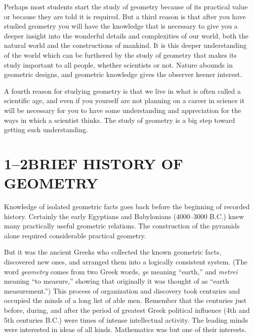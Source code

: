 \documentclass[11pt]{book}
\begin{document}
Perhaps most students start the study of geometry because of its practical value
or because they are told it is required. But a third reason is that after you
have studied geometry you will have the knowledge that is necessary to give you a
deeper insight into the wonderful details and complexities of our world, both the
natural world and the constructions of mankind. It is this deeper understanding
of the world which can be furthered by the study of geometry that makes its study
important to all people, whether scientists or not. Nature abounds in geometric
designs, and geometric knowledge gives the observer keener interest.

A fourth reason for studying geometry is that we live in what is often called a
scientific age, and even if you yourself are not planning on a career in science
it will be necessary for you to have some understanding and appreciation for the
ways in which a scientist thinks. The study of geometry is a big step toward
getting such understanding.

\section*{1--2\quad BRIEF HISTORY OF GEOMETRY}

\setcounter{footnote}{0}
Knowledge of isolated geometric facts goes back before the beginning of recorded
history. Certainly the early Egyptians and Babylonians (4000--3000 B.C.) knew
many practically useful geometric relations. The construction of the pyramids
alone required considerable practical geometry.

But it was the ancient Greeks who collected the known geometric facts, discovered
new ones, and arranged them into a logically consistent system. (The word
\emph{geometry} comes from two Greek words, \emph{ge} meaning ``earth,'' and
\emph{metrei} meaning ``to measure,'' showing that originally it was thought of
as ``earth measurement.'') This process of organization and discovery took
centuries and occupied the minds of a long list of able men. Remember that the
centuries just before, during, and after the period of greatest Greek political
influence (4th and 5th centuries B.C.) were times of intense intellectual
activity. The leading minds were interested in ideas of all kinds. Mathematics
was but one of their interests.
\end{document}
